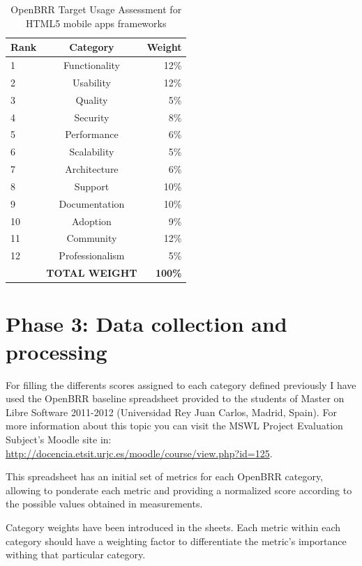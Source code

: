 \documentclass[a4paper,12pt]{book}
\begin{document}
\begin{table}[ht]
\begin{center}
    \begin{tabular}{ | l | c | r |}
    \hline
    \textbf{Rank} & \textbf{Category} & \textbf{Weight} \\ \hline
    1 & Functionality & 12\% \\ \hline
    2 & Usability & 12\% \\ \hline
    3 & Quality & 5\% \\ \hline
    4 & Security & 8\% \\ \hline
    5 & Performance & 6\% \\ \hline
    6 & Scalability & 5\% \\ \hline
    7 & Architecture & 6\% \\ \hline
    8 & Support & 10\% \\ \hline
    9 & Documentation & 10\% \\ \hline
    10 & Adoption & 9\% \\ \hline
    11 & Community & 12\% \\ \hline
    12 & Professionalism & 5\% \\ \hline
     & \textbf{TOTAL WEIGHT} & \textbf{100\%} \\ \hline  
    \end{tabular}
\end{center}
 \caption{OpenBRR Target Usage Assessment for HTML5 mobile apps frameworks}
\label{OpenBRR2}
\end{table}

\section{Phase 3: Data collection and processing}
\label{sec:phase3}
For filling the differents scores assigned to each category defined previously I have used the OpenBRR baseline spreadsheet provided to the students of Master on Libre Software 2011-2012 (Universidad Rey Juan Carlos, Madrid, Spain).
For more information about this topic you can visit the MSWL Project Evaluation Subject's Moodle site in:\\
\url{http://docencia.etsit.urjc.es/moodle/course/view.php?id=125}. 

This spreadsheet has an initial set of metrics for each OpenBRR category, allowing to ponderate each metric and providing a normalized score according to the possible values obtained in measurements.

Category weights have been introduced in the sheets. Each metric within each
category should have a weighting factor to differentiate the metric's
importance withing that particular category. 
\end{document}
